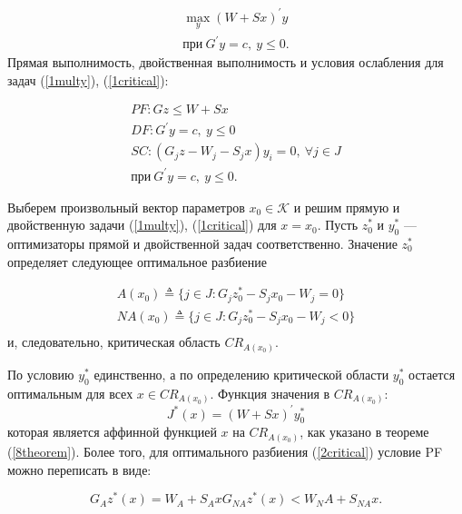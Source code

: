 \begin{equation}\label{1critical}
    \begin{split}
       \max_y(W + Sx)^{'}y\\
        \text{при}\ G^{'}y = c,\ y \leq 0.
    \end{split}
\end{equation}
Прямая выполнимость, двойственная выполнимость и условия ослабления для задач (\ref{1multy}), (\ref{1critical}):

\begin{equation}\label{1critical}
    \begin{split}
            PF: Gz \leq W + Sx \\
            DF: G^{'}y = c,\ y \leq 0 \\
            SC: (G_{j}z - W_j - S_{j}x)y_i = 0, \ \forall j \in J \\
            \text{при}\ G^{'}y = c,\ y \leq 0.
        \end{split}
    \end{equation}


Выберем произвольный вектор параметров $x_0 \in \mathcal{K}$ и решим прямую и двойственную задачи (\ref{1multy}), (\ref{1critical}) для $x = x_0$. Пусть $z^*_0$ и $y^*_0$ --- оптимизаторы прямой и двойственной задач соответственно. Значение $z^*_0$ определяет следующее оптимальное разбиение

\begin{equation}\label{2critical}
    \begin{split}
        A(x_0) \triangleq \{ j \in J: G_{j}z^*_0 - S_{j}x_0 - W_j = 0 \}\\
        NA(x_0) \triangleq \{ j \in J: G_{j}z^*_0 - S_{j}x_0 - W_j < 0 \}\\
    \end{split}
\end{equation}
и, следовательно, критическая область $CR_{A (x_0)}$.

По условию $y^*_0$ единственно, а по определению критической области $y^*_0$ остается оптимальным для всех $x \in CR_{A (x_0)}$. Функция значения в $CR_{A (x_0)}$:
\begin{equation}\label{3critical}
   J^*(x) = (W + Sx)^{'}y^*_0
\end{equation}
которая является аффинной функцией $x$ на $CR_{A (x_0)}$, как указано в теореме (\ref{8theorem}). Более того, для оптимального разбиения (\ref{2critical}) условие PF можно переписать в виде:

\begin{equation}\label{4critical}
   G_{A}z^{*}(x) = W_A + S_{A}x
   G_{NA}z^{*}(x) < W_NA + S_{N A}x.
 \end{equation}

